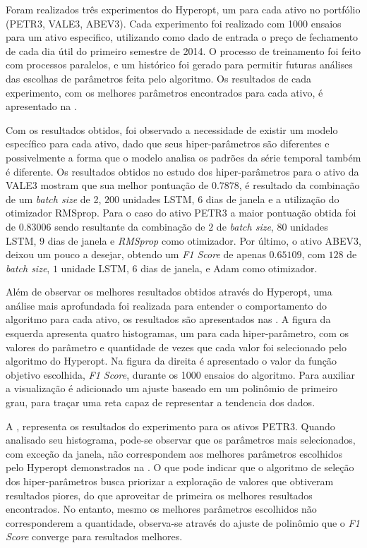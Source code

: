 

Foram realizados três experimentos do Hyperopt, um para cada ativo no portfólio (PETR3, VALE3, ABEV3). Cada experimento foi realizado com 1000 ensaios para um ativo especifico, utilizando como dado de entrada o preço de fechamento de cada dia útil do primeiro semestre de 2014. O processo de treinamento foi feito com processos paralelos, e um histórico foi gerado para permitir futuras análises das escolhas de parâmetros feita pelo algoritmo. Os resultados de cada experimento, com os melhores parâmetros encontrados para cada ativo, é apresentado na .



Com os resultados obtidos, foi observado a necessidade de existir um modelo específico para cada ativo, dado que seus hiper-parâmetros são diferentes e possivelmente a forma que o modelo analisa os padrões da série temporal também é diferente. Os resultados obtidos no estudo dos hiper-parâmetros para o ativo da VALE3 mostram que sua melhor pontuação de $0.7878$, é resultado da combinação de um \textit{batch size} de 2, $200$ unidades LSTM, $6$ dias de janela e a utilização do otimizador RMSprop. Para o caso do ativo PETR3 a maior pontuação obtida foi de $0.83006$ sendo resultante da combinação de $2$ de \textit{batch size}, $80$ unidades \acrshort{LSTM}, $9$ dias de janela e \textit{RMSprop} como otimizador. Por último, o ativo ABEV3, deixou um pouco a desejar, obtendo um \textit{F1 Score} de apenas $0.65109$, com $128$ de \textit{batch size}, $1$ unidade \acrshort{LSTM}, $6$ dias de janela, e Adam como otimizador.

Além de observar os melhores resultados obtidos através do Hyperopt, uma análise mais aprofundada foi realizada para entender o comportamento do algoritmo para cada ativo, os resultados são apresentados nas . A figura da esquerda apresenta quatro histogramas, um para cada hiper-parâmetro, com os valores do parâmetro e quantidade de vezes que cada valor foi selecionado pelo algoritmo do Hyperopt. Na figura da direita é apresentado o valor da função objetivo escolhida, \emph{F1 Score}, durante os 1000 ensaios do algoritmo. Para auxiliar a visualização é adicionado um ajuste baseado em um polinômio de primeiro grau, para traçar uma reta capaz de representar a tendencia dos dados.

A , representa os resultados do experimento para os ativos PETR3. Quando analisado seu histograma, pode-se observar que os parâmetros mais selecionados, com exceção da janela, não correspondem aos melhores parâmetros escolhidos pelo Hyperopt demonstrados na . O que pode indicar que o algoritmo de seleção dos hiper-parâmetros busca priorizar a exploração de valores que obtiveram resultados piores, do que aproveitar de primeira os melhores resultados encontrados. No entanto, mesmo os melhores parâmetros escolhidos não corresponderem a quantidade, observa-se através do ajuste de polinômio que o \emph{F1 Score} converge para resultados melhores.

